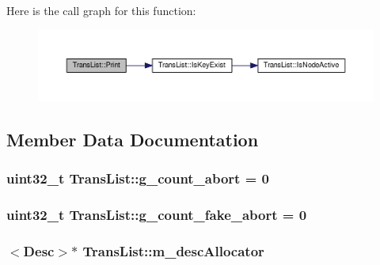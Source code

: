 Here is the call graph for this function\-:
\nopagebreak
\begin{figure}[H]
\begin{center}
\leavevmode
\includegraphics[width=350pt]{classTransList_ac929bd3b5510818780364f4bdb9a97c5_cgraph}
\end{center}
\end{figure}




\subsection{Member Data Documentation}
\hypertarget{classTransList_a6ada7d29d449b4f1cd7e6d14c82336af}{
\subsubsection[{g\-\_\-count\-\_\-abort}]{\setlength{\rightskip}{0pt plus 5cm}uint32\-\_\-t Trans\-List\-::g\-\_\-count\-\_\-abort = 0\hspace{0.3cm}{\ttfamily [private]}}}\label{classTransList_a6ada7d29d449b4f1cd7e6d14c82336af}
\hypertarget{classTransList_af98bf3b247f89cca25e17602a343388c}{
\subsubsection[{g\-\_\-count\-\_\-fake\-\_\-abort}]{\setlength{\rightskip}{0pt plus 5cm}uint32\-\_\-t Trans\-List\-::g\-\_\-count\-\_\-fake\-\_\-abort = 0\hspace{0.3cm}{\ttfamily [private]}}}\label{classTransList_af98bf3b247f89cca25e17602a343388c}
\hypertarget{classTransList_a43e41c095b8a7f6ec6f9eed32db81179}{
\subsubsection[{m\-\_\-desc\-Allocator}]{$<${\bf Desc}$>$$\ast$ Trans\-List\-::m\-\_\-desc\-Allocator\hspace{0.3cm}{\ttfamily [private]}}}\label{classTransList_a43e41c095b8a7f6ec6f9eed32db81179}
